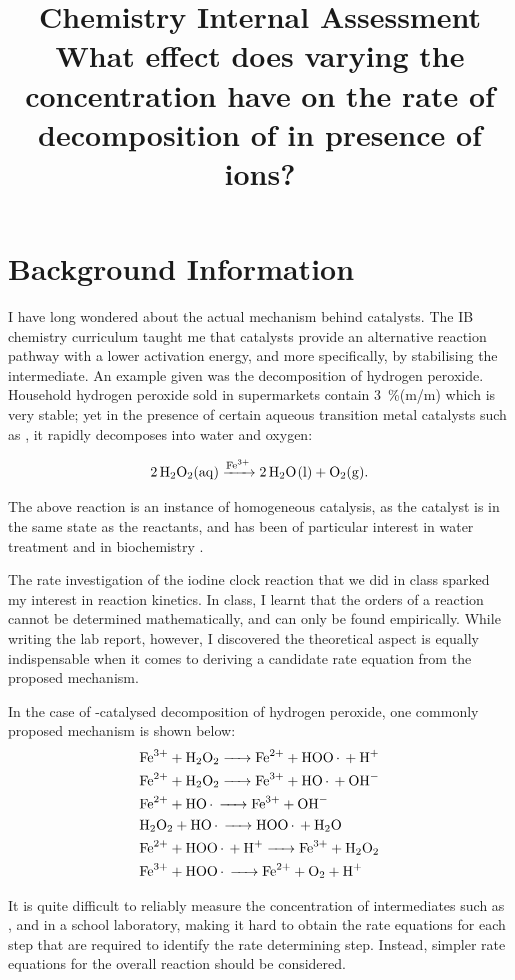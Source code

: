 \documentclass[a4paper, 12pt]{article}
\title{
\textbf{Chemistry Internal Assessment}\\
\bigskip
What effect does varying the concentration have on the rate of decomposition of \ce{H2O2} in presence of \ce{Fe^3+} ions?
}
\author{}
\date{}
\begin{document}
\maketitle

\section*{Background Information}
I have long wondered about the actual mechanism behind catalysts. The IB chemistry curriculum taught me that catalysts provide an alternative reaction pathway with a lower activation energy, and more specifically, by stabilising the intermediate. An example given was the decomposition of hydrogen peroxide. Household hydrogen peroxide sold in supermarkets contain \SI{3}{\%}(m/m)  which is very stable; yet in the presence of certain aqueous transition metal catalysts such as , it rapidly decomposes into water and oxygen:

\[ \ce{2 H2O2(aq) ->[Fe^3+] 2 H2O(l) + O2(g)}. \]

The above reaction is an instance of homogeneous catalysis, as the catalyst is in the same state as the reactants, and has been of particular interest in water treatment and in biochemistry \cite{de_laat}.

The rate investigation of the iodine clock reaction that we did in class sparked my interest in reaction kinetics. In class, I learnt that the orders of a reaction cannot be determined mathematically, and can only be found empirically. While writing the lab report, however, I discovered the theoretical aspect is equally indispensable when it comes to deriving a candidate rate equation from the proposed mechanism. 

In the case of -catalysed decomposition of hydrogen peroxide, one commonly proposed mechanism \cite{mechanism} is shown below:
\begin{align*}
    \ce{&Fe^3+ + H2O2 -> Fe^2+ + HOO. + H+}\\
    \ce{&Fe^2+ + H2O2 -> Fe^3+ + HO. + OH-}\\
    \ce{&Fe^2+ + HO.  -> Fe^3+ + OH-}\\
    \ce{&H2O2 + HO.   -> HOO. + H2O}\\
    \ce{&Fe^2+ + HOO. + H+ -> Fe^3+ + H2O2}\\
    \ce{&Fe^3+ + HOO. -> Fe^2+ + O2 + H+}
\end{align*}

It is quite difficult to reliably measure the concentration of intermediates such as ,  and  in a school laboratory, making it hard to obtain the rate equations for each step that are required to identify the rate determining step. Instead, simpler rate equations for the overall reaction should be considered.
\end{document}

